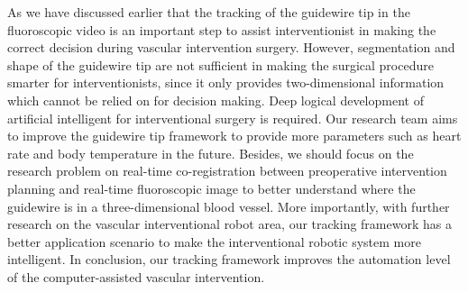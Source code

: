 \documentclass[journal]{IEEEtran}
\begin{document}
As we have discussed earlier that the tracking of the guidewire tip in the fluoroscopic video is an important step to assist interventionist in making the correct decision during vascular intervention surgery. However, segmentation and shape of the guidewire tip are not sufficient in making the surgical procedure smarter for interventionists, since it only provides two-dimensional information which cannot be relied on for decision making. Deep logical development of artificial intelligent for interventional surgery is required. Our research team aims to improve the guidewire tip framework to provide more parameters such as heart rate and body temperature in the future. Besides, we should focus on the research problem on real-time co-registration between preoperative intervention planning and real-time fluoroscopic image to better understand where the guidewire is in a three-dimensional blood vessel. More importantly, with further research on the vascular interventional robot area, our tracking framework has a better application scenario to make the interventional robotic system more intelligent. In conclusion, our tracking framework improves the automation level of the computer-assisted vascular intervention.



%
%

\end{document}
